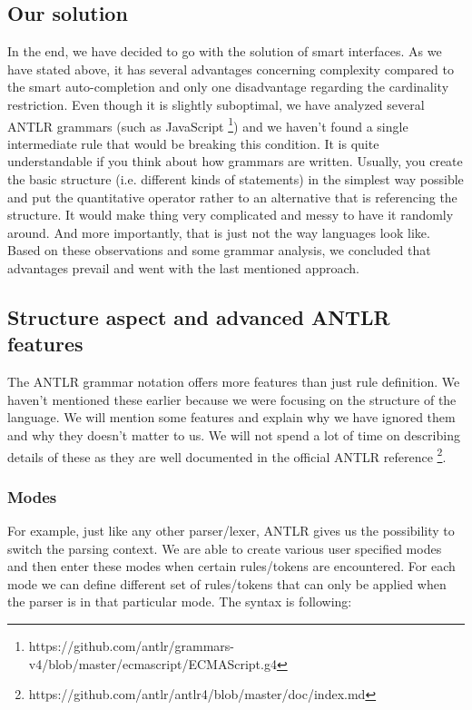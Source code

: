 \subsection{Our solution}

In the end, we have decided to go with the solution of smart interfaces. As we have stated above, it has several advantages concerning complexity compared to the smart auto-completion and only one disadvantage regarding the cardinality restriction. Even though it is slightly suboptimal, we have analyzed several ANTLR grammars (such as JavaScript \footnote{https://github.com/antlr/grammars-v4/blob/master/ecmascript/ECMAScript.g4}) and we haven't found a single intermediate rule that would be breaking this condition. It is quite understandable if you think about how grammars are written. Usually, you create the basic structure (i.e. different kinds of statements) in the simplest way possible and put the quantitative operator rather to an alternative that is referencing the structure. It would make thing very complicated and messy to have it randomly around. And more importantly, that is just not the way languages look like. 
\\

Based on these observations and some grammar analysis, we concluded that advantages prevail and went with the last mentioned approach.

\subsection{Structure aspect and advanced ANTLR features}

The ANTLR grammar notation offers more features than just rule definition. We haven't mentioned these earlier because we were focusing on the structure of the language. We will mention some features and explain why we have ignored them and why they doesn't matter to us. We will not spend a lot of time on describing details of these as they are well documented in the official ANTLR reference \footnote{https://github.com/antlr/antlr4/blob/master/doc/index.md}.

\subsubsection{Modes}

For example, just like any other parser/lexer, ANTLR gives us the possibility to switch the parsing context. We are able to create various user specified modes and then enter these modes when certain rules/tokens are encountered. For each mode we can define different set of rules/tokens that can only be applied when the parser is in that particular mode. The syntax is following:

